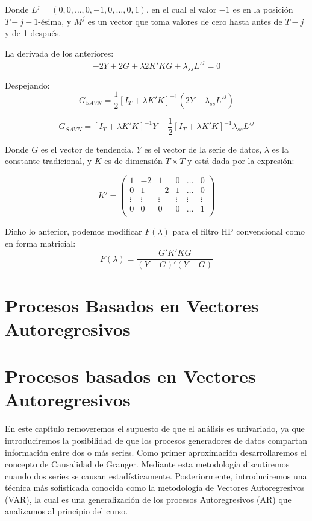 \documentclass[
]{book}
\begin{document}
Donde \(L^j = (0, 0, \ldots, 0, -1, 0, \ldots, 0, 1)\), en el cual el valor \(-1\) es en la posición \(T-j-1\)-ésima, y \(M^j\) es un vector que toma valores de cero hasta antes de \(T-j\) y de 1 después.

La derivada de los anteriores:
\[-2 Y + 2 G + \lambda 2 K' K G + \lambda_{ss} L'^j = 0\]

Despejando:
\[G_{SAVN} = \frac{1}{2} [I_T + \lambda K' K]^{-1} (2 Y - \lambda_{ss} L'^j)\]

\[G_{SAVN} = [I_T + \lambda K' K]^{-1} Y - \frac{1}{2} [I_T + \lambda K' K]^{-1} \lambda_{ss} L'^j\]

Donde \(G\) es el vector de tendencia, \(Y\) es el vector de la serie de datos, \(\lambda\) es la constante tradicional, y \(K\) es de dimensión \(T \times T\) y está dada por la expresión:

\[K' =
\begin{pmatrix}
1 & -2 & 1 & 0 & \ldots & 0 \\
0 & 1 & -2 & 1 & \ldots & 0 \\
\vdots & \vdots &  \vdots &  \vdots &  \vdots &  \vdots \\
0 & 0 & 0 & 0 & \ldots & 1 \\
\end{pmatrix}
\]

Dicho lo anterior, podemos modificar \(F(\lambda)\) para el filtro HP convencional como en forma matricial:
\[F(\lambda) = \frac{G' K' K G}{(Y - G)'(Y - G)}\]

\hypertarget{procesos-basados-en-vectores-autoregresivos}{%
\chapter{Procesos Basados en Vectores Autoregresivos}\label{procesos-basados-en-vectores-autoregresivos}}

\chapter{Procesos basados en Vectores Autoregresivos}

En este capítulo removeremos el supuesto de que el análisis es univariado, ya que introduciremos la posibilidad de que los procesos generadores de datos compartan información entre dos o más series. Como primer aproximación desarrollaremos el concepto de Causalidad de Granger. Mediante esta metodología discutiremos cuando dos series se causan estadísticamente. Posteriormente, introduciremos una técnica más sofisticada conocida como la metodología de Vectores Autoregresivos (VAR), la cual es una generalización de los procesos Autoregresivos (AR) que analizamos al principio del curso.
\end{document}
